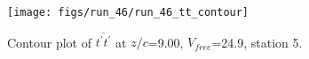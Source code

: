 \begin{figure}[H]
\centering
\texttt{[image: figs/run\_46/run\_46\_tt\_contour]}
\caption{Contour plot of $\overline{t^\prime t^\prime}$ at $z/c$=9.00, $V_{free}$=24.9, station 5.}
\label{fig:run_46_tt_contour}
\end{figure}



